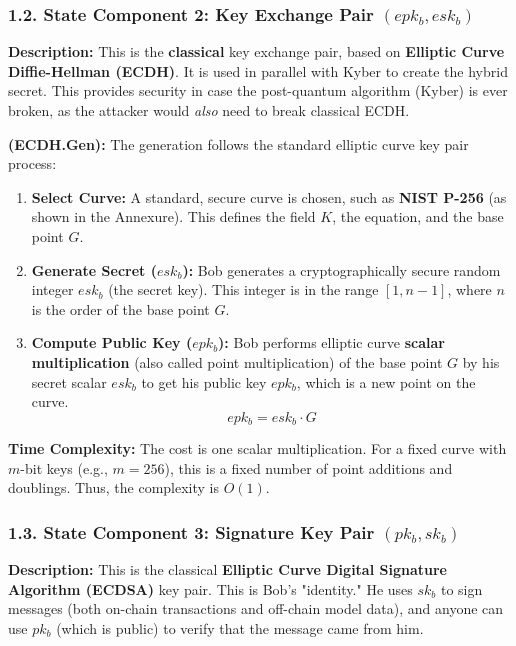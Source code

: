 \documentclass[12pt]{article}
\begin{document}
\subsubsection*{1.2. State Component 2: Key Exchange Pair $(epk_b, esk_b)$}

\textbf{Description:}
This is the \textbf{classical} key exchange pair, based on \textbf{Elliptic Curve Diffie-Hellman (ECDH)}. It is used in parallel with Kyber to create the hybrid secret. This provides security in case the post-quantum algorithm (Kyber) is ever broken, as the attacker would \textit{also} need to break classical ECDH.

\textbf{ (ECDH.Gen):}
The generation follows the standard elliptic curve key pair process:
\begin{enumerate}
    \item \textbf{Select Curve:} A standard, secure curve is chosen, such as \textbf{NIST P-256} (as shown in the Annexure). This defines the field $K$, the equation, and the base point $G$.
    \item \textbf{Generate Secret ($esk_b$):} Bob generates a cryptographically secure random integer $esk_b$ (the secret key). This integer is in the range $[1, n-1]$, where $n$ is the order of the base point $G$.
    \item \textbf{Compute Public Key ($epk_b$):} Bob performs elliptic curve \textbf{scalar multiplication} (also called point multiplication) of the base point $G$ by his secret scalar $esk_b$ to get his public key $epk_b$, which is a new point on the curve.
    \[
    epk_b = esk_b \cdot G
    \]
\end{enumerate}

\textbf{Time Complexity:}
The cost is one scalar multiplication. For a fixed curve with $m$-bit keys (e.g., $m=256$), this is a fixed number of point additions and doublings. Thus, the complexity is \textbf{$O(1)$}.

\subsubsection*{1.3. State Component 3: Signature Key Pair $(pk_b, sk_b)$}

\textbf{Description:}
This is the classical \textbf{Elliptic Curve Digital Signature Algorithm (ECDSA)} key pair. This is Bob's "identity." He uses $sk_b$ to sign messages (both on-chain transactions and off-chain model data), and anyone can use $pk_b$ (which is public) to verify that the message came from him.
\end{document}
